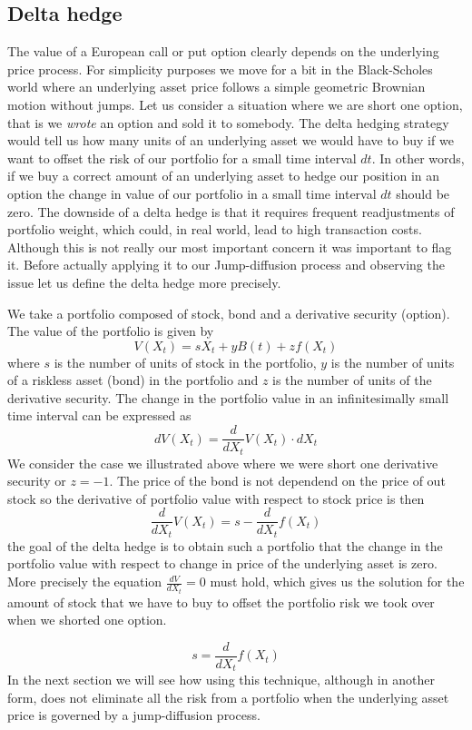 \documentclass[times, utf8, diplomski]{fer}
\begin{document}
\subsection{Delta hedge}
The value of a European call or put option clearly depends on the underlying price process. For simplicity purposes we move for a bit in the Black-Scholes world where an underlying asset price follows a simple geometric Brownian motion without jumps. Let us consider a situation where we are short one option, that is we \textit{wrote} an option and sold it to somebody. The delta hedging strategy would tell us how many units of an underlying asset we would have to buy if we want to offset the risk of our portfolio for a small time interval $dt$. In other words, if we buy a correct amount of an underlying asset to hedge our position in an option the change in value of our portfolio in a small time interval $dt$ should be zero. The downside of a delta hedge is that it requires frequent readjustments of portfolio weight, which could, in real world, lead to high transaction costs. Although this is not really our most important concern it was important to flag it. Before actually applying it to our Jump-diffusion process and observing the issue let us define the delta hedge more precisely.

We take a portfolio composed of stock, bond and a derivative security (option). The value of the portfolio is given by
$$ V(X_t) = sX_t + yB(t) + zf(X_t)$$
where $s$ is the number of units of stock in the portfolio, $y$ is the number of units of a riskless asset (bond) in the portfolio and $z$ is the number of units of the derivative security.
The change in the portfolio value in an infinitesimally small time interval can be expressed as
$$
	dV(X_t) = \frac{d}{dX_t}V(X_t) \cdot dX_t
$$ We consider the case we illustrated above where we were short one derivative security or $z=-1$. The price of the bond is not dependend on the price of out stock so the derivative of portfolio value with respect to stock price is then $$ \frac{d}{dX_t}V(X_t) = s - \frac{d}{dX_t}f(X_t) $$ the goal of the delta hedge is to obtain such a portfolio that the change in the portfolio value with respect to change in price of the underlying asset is zero. More precisely the equation $\frac{dV}{dX_t} = 0$ must hold, which gives us the solution for the amount of stock that we have to buy to offset the portfolio risk we took over when we shorted one option. 

\begin{equation}
	s = \frac{d}{dX_t}f(X_t)
\end{equation} In the next section we will see how using this technique, although in another form, does not eliminate all the risk from a portfolio when the underlying asset price is governed by a jump-diffusion process. 
\end{document}
